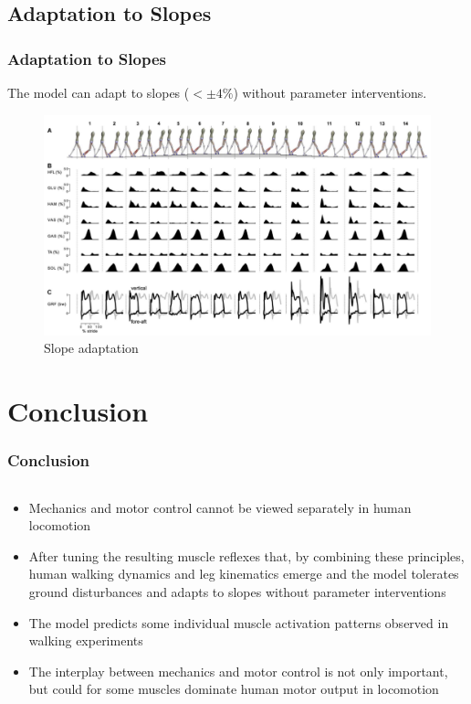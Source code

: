 \documentclass[10pt]{beamer}
\begin{document}
\subsection[Results]{Adaptation to Slopes}

\begin{frame}
	\frametitle{Adaptation to Slopes}
	
	The model can adapt to slopes ($ < \pm 4\% $) without parameter interventions.
	
	\begin{figure}
		\centering
		\includegraphics[height=.65\textheight]{images/slope_adaptation.pdf}
		\caption{Slope adaptation}	
	\end{figure}
	
\end{frame}

\section{Conclusion}	
\begin{frame}
	\frametitle{Conclusion}
	
	\begin{columns}
		\begin{column}{1.0\textwidth}
			\begin{itemize}
				\item Mechanics and motor control cannot be viewed separately in human locomotion
				\item After tuning the resulting muscle reflexes that, by combining these principles, human walking dynamics and leg kinematics emerge and the model tolerates ground disturbances and adapts to slopes without parameter interventions
				\item The model predicts some individual muscle activation patterns observed in walking experiments
				\item The interplay between mechanics and motor control is not only important, but could for some muscles dominate human motor output in locomotion
			\end{itemize}
		\end{column}
	\end{columns}
\end{frame}
	
\end{document}
